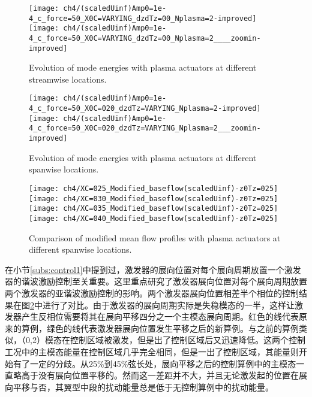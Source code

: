 \begin{figure}
\centering
\texttt{[image: ch4/(scaledUinf)Amp0=1e-4\_c\_force=50\_X0C=VARYING\_dzdTz=00\_Nplasma=2-improved]}
\texttt{[image: ch4/(scaledUinf)Amp0=1e-4\_c\_force=50\_X0C=VARYING\_dzdTz=00\_Nplasma=2\_\_\_\_zoomin-improved]}
\caption{Evolution of mode energies with plasma actuators at different streamwise locations.}%
\label{f:streamwiselocationeffect}
\end{figure}
\begin{figure}
\centering
\texttt{[image: ch4/(scaledUinf)Amp0=1e-4\_c\_force=50\_X0C=020\_dzdTz=VARYING\_Nplasma=2-improved]}
\texttt{[image: ch4/(scaledUinf)Amp0=1e-4\_c\_force=50\_X0C=020\_dzdTz=VARYING\_Nplasma=2\_\_\_zoomin-improved]}
\caption{Evolution of mode energies with plasma actuators at different spanwise locations.}%
\label{f:spanwiselocationeffect}
\end{figure}
\begin{figure}
\centering
\texttt{[image: ch4/XC=025\_Modified\_baseflow(scaledUinf)-z0Tz=025]}
\texttt{[image: ch4/XC=030\_Modified\_baseflow(scaledUinf)-z0Tz=025]}
\texttt{[image: ch4/XC=035\_Modified\_baseflow(scaledUinf)-z0Tz=025]}
\texttt{[image: ch4/XC=040\_Modified\_baseflow(scaledUinf)-z0Tz=025]}
\caption{Comparison of modified mean flow profiles with plasma actuators  at different spanwise locations.}%
\label{f:Wt_SpVar}
\end{figure}

在小节\ref{subs:control1}中提到过，激发器的展向位置对每个展向周期放置一个激发器的谐波激励控制至关重要。这里重点研究了激发器展向位置对每个展向周期放置两个激发器的亚谐波激励控制的影响。两个激发器展向位置相差半个相位的控制结果在图\ref{f:spanwiselocationeffect}中进行了对比。由于激发器的展向周期实际是失稳模态的一半，这样让激发器产生反相位需要将其在展向平移四分之一个主模态展向周期。红色的线代表原来的算例，绿色的线代表激发器展向位置发生平移之后的新算例。与之前的算例类似，（0,2）模态在控制区域被激发，但是出了控制区域后又迅速降低。这两个控制工况中的主模态能量在控制区域几乎完全相同，但是一出了控制区域，其能量则开始有了一定的分歧。从25\%到45\%弦长处，展向平移之后的控制算例中的主模态一直略高于没有展向位置平移的。然而这一差距并不大，并且无论激发起的位置在展向平移与否，其翼型中段的扰动能量总是低于无控制算例中的扰动能量。

